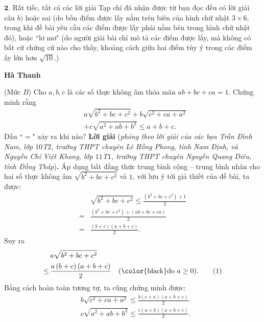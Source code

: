 \begin{multicols}{2}
	\vskip 0.05cm 
	$\pmb{2.}$ Rất tiếc, tất cả các lời giải Tạp chí đã nhận được từ bạn đọc đều có lời giải câu $b)$ hoặc sai (do bốn điểm được lấy nằm trên biên của hình chữ nhật $3\times 6$, trong khi đề bài yêu cầu các điểm được lấy phải nằm bên trong hình chữ nhật đó), hoặc ``lơ mơ" (do người giải bài chỉ mô tả các điểm được lấy, mà không có bất cứ chứng cứ nào cho thấy, khoảng cách giữa hai điểm tùy ý trong các điểm ấy lớn hơn  $\sqrt{10}$.)
	\begin{flushright}
		\textbf{\color{thachthuctoanhoc}Hà Thanh}
	\end{flushright}
	{}
	(Mức $B$) Cho $a, b, c$ là các số thực không âm thỏa mãn $a b+b c+c a=1$. Chứng minh rằng
	\begin{align*}
		&a \sqrt{b^{2}+b c+c^{2}}+b \sqrt{c^{2}+c a+a^{2}}\\
		&+c \sqrt{a^{2}+a b+b^{2}} \le a+b+c .
	\end{align*}
	Dấu ``$=$" xảy ra khi nào?
	\vskip 0.05cm
	\textbf{\color{thachthuctoanhoc}Lời giải} (\textit{phỏng theo lời giải của các bạn Trần Đình Nam, lớp $10$T$2$, trường THPT chuyên Lê Hồng Phong, tỉnh Nam Định, và Nguyễn Chí Việt Khang, lớp $11$T$1$, trường THPT chuyên Nguyễn Quang Diêu, tỉnh Đồng Tháp})\textbf{\color{thachthuctoanhoc}.}
	\vskip 0.05cm
	Áp dụng bất đẳng thức trung bình cộng -- trung bình nhân cho hai số thực không âm  $\sqrt {{b^2} + bc + {c^2}} $ và $1$, với lưu ý tới giả thiết của đề bài, ta được:
	\begin{align*}
		&\sqrt {{b^2} + bc + {c^2}}  \le \frac{{\left( {{b^2} + bc + {c^2}} \right) + 1}}{2} \\
		= &\frac{{\left( {{b^2} + bc + {c^2}} \right) + \left( {ab + bc + ca} \right)}}{2} \\
		= &\frac{{\left( {b + c} \right)\left( {a + b + c} \right)}}{2}.
	\end{align*}
	Suy ra 
	\begin{align*}
		&a\sqrt {{b^2} + bc + {c^2}}  \\
		\le\, &\frac{{a\left( {b + c} \right)\left( {a + b + c} \right)}}{2} \quad(\text{\color{black}do } a \ge 0). \tag{$1$}
	\end{align*}
	Bằng cách hoàn toàn tương tự, ta cũng chứng minh được:
	\begin{align*}
		&b\sqrt {\!{c^2} \!+\! ca \!+\! {a^2}} \le\! \frac{{b\left( {c \!+\! a} \right)\left( {a \!+\! b \!+\! c} \right)}}{2}.\tag{$2$}\\
		&c\sqrt {\!{a^2} \!+\! ab \!+\! {b^2}} \le\! \frac{{c\left( {a \!+\! b} \right)\left(\!{a \!+\! b \!+\! c} \right)}}{2}.\tag{$3$}

\end{align*}
\end{multicols}
